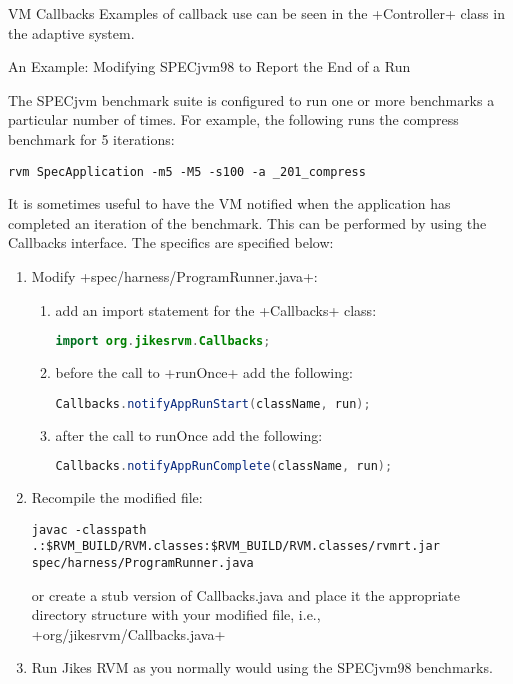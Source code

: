 \begin{section}{VM Callbacks}
Examples of callback use can be seen in the \spverb+Controller+ class in the adaptive system.


\begin{subsection}{An Example: Modifying SPECjvm98 to Report the End of a Run}

The SPECjvm benchmark suite is configured to run one or more benchmarks a particular number of times. For example, the following runs the compress benchmark for 5 iterations:
\begin{lstlisting}
rvm SpecApplication -m5 -M5 -s100 -a _201_compress
\end{lstlisting}

It is sometimes useful to have the VM notified when the application has completed an iteration of the benchmark. This can be performed by using the Callbacks interface. The specifics are specified below:
\begin{enumerate}
  \item Modify \spverb+spec/harness/ProgramRunner.java+:
    \begin{enumerate}
      \item add an import statement for the \spverb+Callbacks+ class:
        \begin{lstlisting}[language=Java]
import org.jikesrvm.Callbacks;
        \end{lstlisting}
      \item before the call to \spverb+runOnce+ add the following:
        \begin{lstlisting}[language=Java]
Callbacks.notifyAppRunStart(className, run);
        \end{lstlisting}
      \item after the call to runOnce add the following:
        \begin{lstlisting}[language=Java]
Callbacks.notifyAppRunComplete(className, run);
        \end{lstlisting}
    \end{enumerate}
  \item Recompile the modified file:
    \begin{lstlisting}
javac -classpath .:$RVM_BUILD/RVM.classes:$RVM_BUILD/RVM.classes/rvmrt.jar spec/harness/ProgramRunner.java
    \end{lstlisting}
    or create a stub version of Callbacks.java and place it the appropriate directory structure with your modified file, i.e., \spverb+org/jikesrvm/Callbacks.java+
  \item  Run Jikes RVM as you normally would using the SPECjvm98 benchmarks.
\end{enumerate}


\end{subsection}
\end{section}

